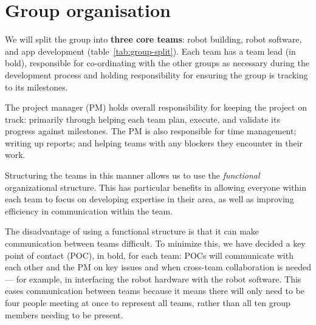 \documentclass{article}
\begin{document}
\section{Group organisation}
\begin{table}[]
  \caption{Team splits across the group. Names in bold are key points of contact.}
  \label{tab:group-split}
\end{table}

We will split the group into {\bf three core teams}: robot building, robot software, and app development (table~\ref{tab:group-split}). Each team has a team lead (in bold), responsible for co-ordinating with the other groups as necessary during the development process and holding responsibility for ensuring the group is tracking to its milestones.

The project manager (PM) holds overall responsibility for keeping the project on track: primarily through helping each team plan, execute, and validate its progress against milestones. The PM is also responsible for time management; writing up reports; and helping teams with any blockers they encounter in their work.

Structuring the teams in this manner allows us to use the {\it functional} organizational structure. This has particular benefits in allowing everyone within each team to focus on developing expertise in their area, as well as improving efficiency in communication within the team.

The disadvantage of using a functional structure is that it can make communication between teams difficult. To minimize this, we have decided a key point of contact (POC), in bold, for each team: POCs will communicate with each other and the PM on key issues and when cross-team collaboration is needed --- for example, in interfacing the robot hardware with the robot software. This eases communication between teams because it means there will only need to be four people meeting at once to represent all teams, rather than all ten group members needing to be present.
\end{document}
